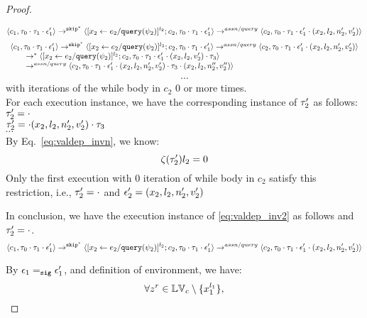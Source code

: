 {\begin{proof}
\begin{subproof}[Subproof]
\begin{enumerate}
  \[
  \langle c_1, \mathtt{\tau}_0 \cdot \mathtt{\tau}_1 \cdot \mathtt{\epsilon}_1' \rangle 
  \rightarrow^{\mathtt{skip}^*} 
  \langle [\mathrel{ {x}_2 \leftarrow e_2 / {\tt query}(\psi_2) }]^{l_2} ; {c}_2, \mathtt{\tau}_0 \cdot \mathtt{\tau}_1 \cdot \mathtt{\epsilon}_1' \rangle 
  \rightarrow^{assn/query} 
  \langle {c}_2,  \mathtt{\tau}_0 \cdot \mathtt{\tau}_1 \cdot \mathtt{\epsilon}_1' \cdot (x_2, l_2, n_2', v_2') \rangle 
 \]
%
  \[
  \begin{array}{l}
  \langle c_1, \mathtt{\tau}_0 \cdot \mathtt{\tau}_1 \cdot \mathtt{\epsilon}_1' \rangle 
  \rightarrow^{\mathtt{skip}^*} 
  \langle [\mathrel{ {x}_2 \leftarrow e_2 / {\tt query}(\psi_2) }]^{l_2} ; {c}_2, \mathtt{\tau}_0 \cdot \mathtt{\tau}_1 \cdot \mathtt{\epsilon}_1' \rangle 
  \rightarrow^{assn/query} 
  \langle {c}_2,  \mathtt{\tau}_0 \cdot \mathtt{\tau}_1 \cdot \mathtt{\epsilon}_1' \cdot (x_2, l_2, n_2', v_2') \rangle 
  \\ \qquad
  \rightarrow^{*} 
  \langle [\mathrel{ {x}_2 \leftarrow e_2 / {\tt query}(\psi_2) }]^{l_2} ; {c}_2, 
  \mathtt{\tau}_0 \cdot \mathtt{\tau}_1 \cdot \mathtt{\epsilon}_1' \cdot (x_2, l_2, v_2') \cdot \mathtt{\tau}_3 \rangle 
  \\ \qquad
  \rightarrow^{assn/query} 
  \langle {c}_2,  \mathtt{\tau}_0 \cdot \mathtt{\tau}_1 \cdot \mathtt{\epsilon}_1' \cdot (x_2, l_2, n_2', v_2') \cdot \mathtt{\tau}_3 \cdot (x_2, l_2, n_2'', v_2'') \rangle 
 \end{array}
 \]
\[
  \cdots
\] 
with iterations of the while body in $c_2$ $0$ or more times.
%
\\
%
For each execution instance, we have the corresponding instance of $\mathtt{\tau}_2'$ as follows:
\\
  $\mathtt{\tau}_2'  = \cdot$
\\
$\mathtt{\tau}_2' = \cdot (x_2, l_2, n_2', v_2') \cdot \mathtt{\tau}_3 $
%
\\
$\cdots$
%
\\
%
By Eq.~\ref{eq:valdep_invn}, we know:
%
\[
 \mathtt{\zeta}(\mathtt{\tau}_2') l_2 = 0
\]
%
Only the first execution with 0 iteration of while body in $c_2$ satisfy this restriction, i.e., $\mathtt{\tau}_2' = \cdot$ and $\mathtt{\epsilon}_2' = (x_2, l_2, n_2', v_2')$
%
\end{enumerate}
In conclusion, we have the execution instance of \ref{eq:valdep_inv2}  as follows and $\mathtt{\tau}_2' = \cdot$.
  \[
  \langle c_1, \mathtt{\tau}_0 \cdot \mathtt{\tau}_1 \cdot \mathtt{\epsilon}_1' \rangle 
  \rightarrow^{\mathtt{skip}^*} 
  \langle [\mathrel{ {x}_2 \leftarrow e_2 / {\tt query}(\psi_2) }]^{l_2} ; {c}_2, \mathtt{\tau}_0 \cdot \mathtt{\tau}_1 \cdot \mathtt{\epsilon}_1' \rangle 
  \rightarrow^{assn/query} 
  \langle {c}_2,  \mathtt{\tau}_0 \cdot \mathtt{\tau}_1 \cdot \mathtt{\epsilon}_1' \cdot (x_2, l_2, n_2', v_2') \rangle 
 \]
\end{subproof}
%
By $\mathtt{\epsilon}_1 =_{\mathtt{sig}} \mathtt{\epsilon}_1'$, and definition of environment, we have:
\[
  \forall z^r \in \mathbb{LV}_c \setminus \{x_1^{l_1}\} ,
\]
\end{proof}}
